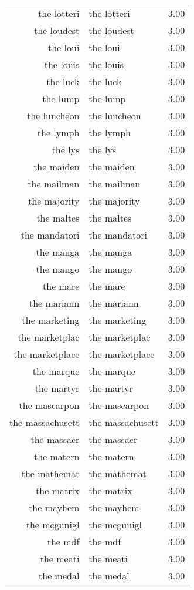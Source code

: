 \begin{table}[ht]
\begin{tabular}{rlr}
  the lotteri & the lotteri & 3.00 \\ 
  the loudest & the loudest & 3.00 \\ 
  the loui & the loui & 3.00 \\ 
  the louis & the louis & 3.00 \\ 
  the luck & the luck & 3.00 \\ 
  the lump & the lump & 3.00 \\ 
  the luncheon & the luncheon & 3.00 \\ 
  the lymph & the lymph & 3.00 \\ 
  the lys & the lys & 3.00 \\ 
  the maiden & the maiden & 3.00 \\ 
  the mailman & the mailman & 3.00 \\ 
  the majority & the majority & 3.00 \\ 
  the maltes & the maltes & 3.00 \\ 
  the mandatori & the mandatori & 3.00 \\ 
  the manga & the manga & 3.00 \\ 
  the mango & the mango & 3.00 \\ 
  the mare & the mare & 3.00 \\ 
  the mariann & the mariann & 3.00 \\ 
  the marketing & the marketing & 3.00 \\ 
  the marketplac & the marketplac & 3.00 \\ 
  the marketplace & the marketplace & 3.00 \\ 
  the marque & the marque & 3.00 \\ 
  the martyr & the martyr & 3.00 \\ 
  the mascarpon & the mascarpon & 3.00 \\ 
  the massachusett & the massachusett & 3.00 \\ 
  the massacr & the massacr & 3.00 \\ 
  the matern & the matern & 3.00 \\ 
  the mathemat & the mathemat & 3.00 \\ 
  the matrix & the matrix & 3.00 \\ 
  the mayhem & the mayhem & 3.00 \\ 
  the mcgunigl & the mcgunigl & 3.00 \\ 
  the mdf & the mdf & 3.00 \\ 
  the meati & the meati & 3.00 \\ 
  the medal & the medal & 3.00 \\ 

\end{tabular}
\end{table}
